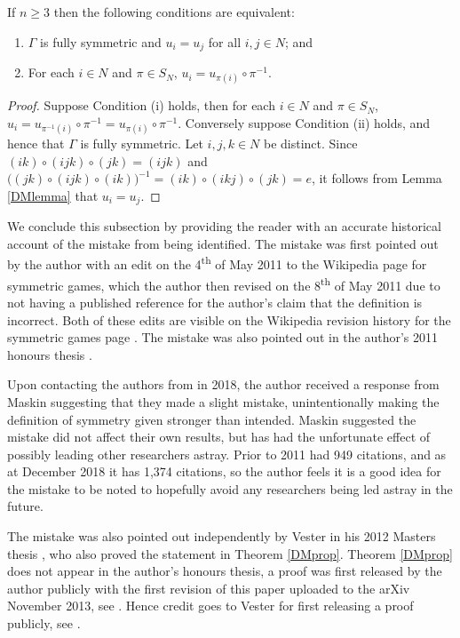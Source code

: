 \begin{theorem} \label{DMprop}
	If $n \geq 3$ then the following conditions are equivalent:
	\begin{enumerate}
		\item $\Gamma$ is fully symmetric and $u_i = u_j$ for all $i, j \in N$; and
		\item For each $i \in N$ and $\pi \in S_N$, $u_i = u_{\pi(i)} \circ \pi^{-1}$.
	\end{enumerate}
	\begin{proof}
		Suppose Condition (i) holds, then for each $i \in N$ and $\pi \in S_N$, $u_i = u_{\pi^{-1}(i)} \circ \pi^{-1} = u_{\pi(i)} \circ \pi^{-1}$. Conversely suppose Condition (ii) holds, and hence that $\Gamma$ is fully symmetric. Let $i, j, k \in N$ be distinct. Since $(ik) \circ (ijk) \circ (jk) = (ijk)$ and $\bigl((jk) \circ (ijk) \circ (ik)\bigr)^{-1} = (ik) \circ (ikj) \circ (jk) =  e$, it follows from Lemma \ref{DMlemma} that $u_i = u_j$. 
	\end{proof}
\end{theorem}

We conclude this subsection by providing the reader with an accurate historical account of the mistake from \cite[Definition 7]{DMaskin} being identified. The mistake was first pointed out by the author with an edit on the 4\textsuperscript{th} of May 2011 to the Wikipedia page for symmetric games, which the author then revised on the 8\textsuperscript{th} of May 2011 due to not having a published reference for the author's claim that the definition is incorrect. Both of these edits are visible on the Wikipedia revision history for the symmetric games page \cite{WikiSGRV}. The mistake was also pointed out in the author's 2011 honours thesis \cite[Subsection 5.8]{ham2011honoursthesis}.

Upon contacting the authors from \cite{DMaskin} in 2018, the author received a response from Maskin suggesting that they made a slight mistake, unintentionally making the definition of symmetry given stronger than intended. Maskin suggested the mistake did not affect their own results, but has had the unfortunate effect of possibly leading other researchers astray. Prior to 2011 \cite{DMaskin} had 949 citations, and as at December 2018 it has 1,374 citations, so the author feels it is a good idea for the mistake to be noted to hopefully avoid any researchers being led astray in the future.

The mistake was also pointed out independently by Vester in his 2012 Masters thesis \cite[Appendix B]{vester2012symmetric}, who also proved the statement in Theorem \ref{DMprop}. Theorem \ref{DMprop} does not appear in the author's honours thesis, a proof was first released by the author publicly with the first revision of this paper uploaded to the arXiv November 2013, see \cite[Version 1]{ham2018arxivversion}. Hence credit goes to Vester for first releasing a proof publicly, see \cite[Theorem 32]{vester2012symmetric}.

